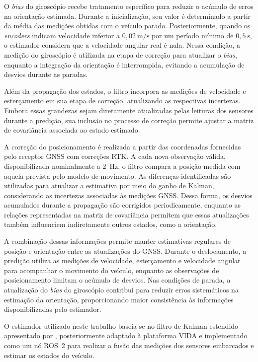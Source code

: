O \textit{bias} do giroscópio recebe tratamento específico para reduzir o acúmulo de erros na orientação estimada. Durante a inicialização, seu valor é determinado a partir da média das medições obtidas com o veículo parado. Posteriormente, quando os \textit{encoders} indicam velocidade inferior a $0{,}02~\mathrm{m/s}$ por um período mínimo de $0{,}5~\mathrm{s}$, o estimador considera que a velocidade angular real é nula. Nessa condição, a medição do giroscópio é utilizada na etapa de correção para atualizar o \textit{bias}, enquanto a integração da orientação é interrompida, evitando a acumulação de desvios durante as paradas.

Além da propagação dos estados, o filtro incorpora as medições de velocidade e esterçamento em sua etapa de correção, atualizando as respectivas incertezas. Embora essas grandezas sejam diretamente atualizadas pelas leituras dos sensores durante a predição, sua inclusão no processo de correção permite ajustar a matriz de covariância associada ao estado estimado.

A correção do posicionamento é realizada a partir das coordenadas fornecidas pelo receptor GNSS com correções RTK. A cada nova observação válida, disponibilizada nominalmente a 2~Hz, o filtro compara a posição medida com aquela prevista pelo modelo de movimento. As diferenças identificadas são utilizadas para atualizar a estimativa por meio do ganho de Kalman, considerando as incertezas associadas às medições GNSS. Dessa forma, os desvios acumulados durante a propagação são corrigidos periodicamente, enquanto as relações representadas na matriz de covariância permitem que essas atualizações também influenciem indiretamente outros estados, como a orientação.

A combinação dessas informações permite manter estimativas regulares de posição e orientação entre as atualizações do GNSS. Durante o deslocamento, a predição utiliza as medições de velocidade, esterçamento e velocidade angular para acompanhar o movimento do veículo, enquanto as observações de posicionamento limitam o acúmulo de desvios. Nas condições de parada, a atualização do \textit{bias} do giroscópio contribui para reduzir erros sistemáticos na estimação da orientação, proporcionando maior consistência às informações disponibilizadas pelo estimador.

O estimador utilizado neste trabalho baseia-se no filtro de Kalman estendido apresentado por \citet{DeLima2015}, posteriormente adaptado à plataforma VIDA e implementado como um nó ROS~2 para realizar a fusão das medições dos sensores embarcados e estimar os estados do veículo.
